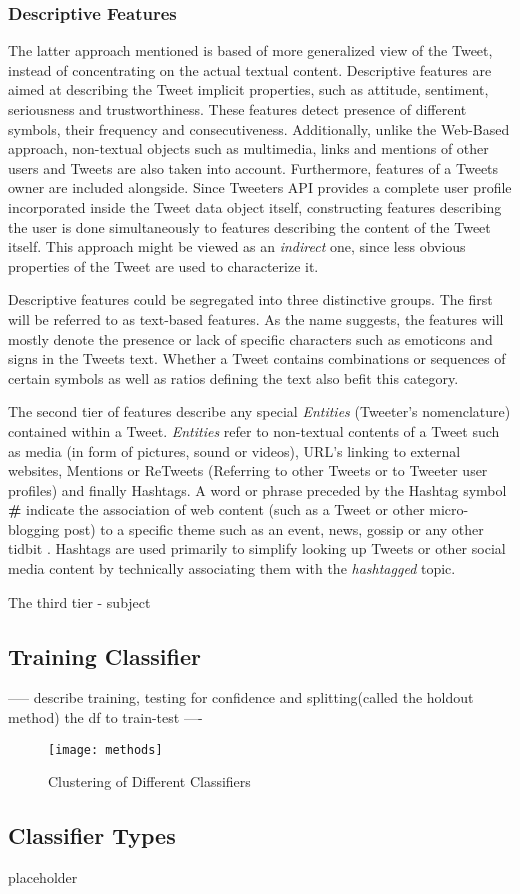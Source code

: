 		
		\subsubsection{Descriptive Features}
		The latter approach mentioned is based of more generalized view of the Tweet, instead of concentrating on the actual textual content. Descriptive features are aimed at describing the Tweet implicit properties, such as attitude, sentiment, seriousness and trustworthiness. These features detect presence of different symbols, their frequency and consecutiveness. Additionally, unlike the Web-Based approach, non-textual objects such as multimedia, links and mentions of other users and Tweets are also taken into account. Furthermore, features of a Tweets owner are included alongside. Since Tweeters API provides a complete user profile incorporated inside the Tweet data object itself, constructing features describing the user is done simultaneously to features describing the content of the Tweet itself. This approach might be viewed as an \textit{indirect} one, since less obvious properties of the Tweet are used to characterize it.
		\par
		Descriptive features could be segregated into three distinctive groups. The first will be referred to as text-based features. As the name suggests, the features will mostly denote the presence or lack of specific characters such as emoticons and signs in the Tweets text. Whether a Tweet contains combinations or sequences of certain symbols as well as ratios defining the text also befit this category.
		\par
		The second tier of features describe any special \textit{Entities} (Tweeter's nomenclature) contained within a Tweet. \textit{Entities} refer to non-textual contents of a Tweet such as media (in form of pictures, sound or videos), URL's linking to external websites, Mentions or ReTweets (Referring to other Tweets or to Tweeter user profiles) and finally Hashtags. A word or phrase preceded by the Hashtag symbol \textbf{\#} indicate the association of web content (such as a Tweet or other micro-blogging post) to a specific theme such as an event, news, gossip or any other tidbit \cite{dict_Tweet}. Hashtags are used primarily to simplify looking up Tweets or other social media content by technically associating them with the \textit{hashtagged} topic.
		\par
		{\color{red}The third tier - subject}
		
		
	\subsection{Training Classifier}	
	{\Large \color{red} ----- describe training, testing for confidence and splitting(called the holdout method) the df to train-test ----}
	\begin{figure}[h]
		
		\centering
		\texttt{[image: methods]}
		\caption{Clustering of Different Classifiers}
	\end{figure}

	\subsection{Classifier Types}
		{\color{red} \Large placeholder}
	
	
	
		
		
		
		